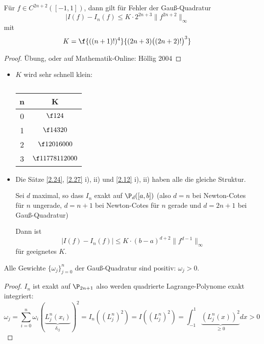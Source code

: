 \documentclass[11pt]{scrartcl}
\begin{document}
\begin{st}[Fehlerschranke]
	\label{2.24}
	Für $f\in C^{2n+2} ([-1,1])$, dann gilt für Fehler der Gauß-Quadratur
	\[
		|I(f) - I_n(f) \le K \cdot 2^{2n+3} \|f^{2n+2}\|_\infty
	\]
	mit
	\[
		K = \f {((n+1)!)^4}{(2n+3)\big((2n+2)!\big)^3}
	\]
	\begin{proof}
		Übung, oder auf Mathematik-Online: Höllig 2004
	\end{proof}
	\begin{note}
		\begin{itemize}
			\item
				$K$ wird sehr schnell klein:
				\begin{table}[!ht]
					\centering
					\caption{}
					\begin{tabular}{c|c}
					n & K \\ \hline
					0 & $\f 1{24}$ \\
					1 & $\f 1{4320}$ \\
					2 & $\f 1{2016000}$ \\
					3 & $\f 1{1778112000}$ 
					\end{tabular}
				\end{table}
			\item
				Die Sätze \ref{2.24}, \ref{2.27} i), ii) und \ref{2.12} i), ii) haben alle die gleiche Struktur.

				Sei $d$ maximal, so dass $I_n$ exakt auf $\P_d([a,b])$ (also $d=n$ bei Newton-Cotes für $n$ ungerade, $d=n+1$ bei Newton-Cotes für $n$ gerade und $d=2n+1$ bei Gauß-Quadratur)

				Dann ist
				\[
					|I(f) - I_n(f) | \le K \cdot (b-a)^{d+2} \|f^{d-1}\|_\infty
				\]
				für geeignetes $K$.
		\end{itemize}
	\end{note}
\end{st}

\begin{st}[Positivität]
	\label{2.25}	
	Alle Gewichte $\{\omega_j\}_{j=0}^n$ der Gauß-Quadratur sind positiv: $\omega_j > 0$.
	\begin{proof}
		$I_n$ ist exakt auf $\P_{2n+1}$ also werden quadrierte Lagrange-Polynome exakt integriert:
		\[
			\omega_j = \sum_{i=0}^n \omega_i (\underbrace{L_j^n(x_i)}_{\delta_{ij}})^2 = I_n((L_j^n)^2) = I((L_j^n)^2) =\int_{-1}^1 \underbrace{(L_j^n(x))^2}_{\ge 0} dx > 0
		\]
	\end{proof}
\end{st}
\end{document}
